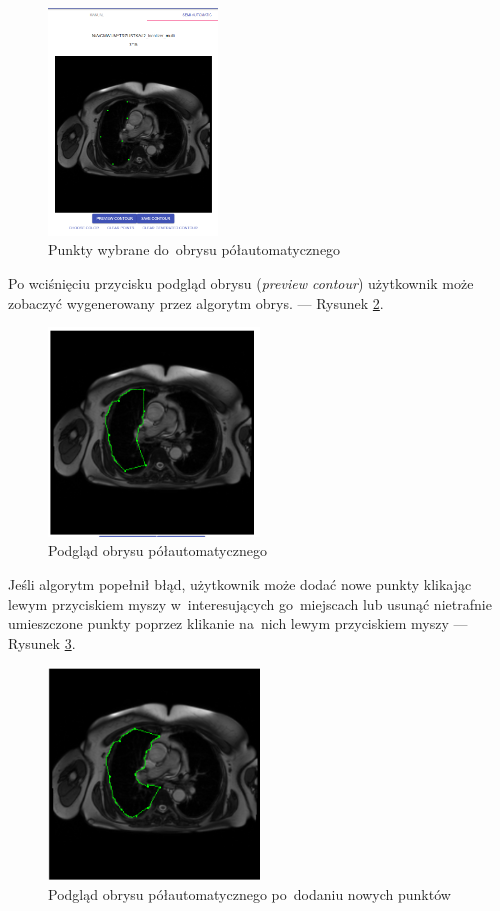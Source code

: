 \documentclass[a4paper,11pt,twoside,openright]{report}
\theoremstyle{definition}
\begin{document}
\begin{figure}[h!]
	\center
	\includegraphics[width=0.4\textwidth]{11}
	\caption{Punkty wybrane do~obrysu półautomatycznego}
    	\label{fig:11}
\end{figure}

\pagebreak

Po wciśnięciu przycisku podgląd obrysu (\textit{preview contour}) użytkownik może
zobaczyć wygenerowany przez algorytm obrys. --- Rysunek \ref{fig:12}.

\begin{figure}[h!]
	\center
	\includegraphics[width=0.5\textwidth]{12}
	\caption{Podgląd obrysu półautomatycznego}
    	\label{fig:12}
\end{figure}

Jeśli algorytm popełnił błąd, użytkownik może dodać nowe punkty klikając lewym
przyciskiem myszy w~interesujących go~miejscach lub usunąć nietrafnie umieszczone
punkty poprzez klikanie na~nich lewym przyciskiem myszy --- Rysunek \ref{fig:13}.

\begin{figure}[h!]
	\center
	\includegraphics[width=0.5\textwidth]{13}
	\caption{Podgląd obrysu półautomatycznego po~dodaniu nowych punktów}
    	\label{fig:13}
\end{figure}
\end{document}
